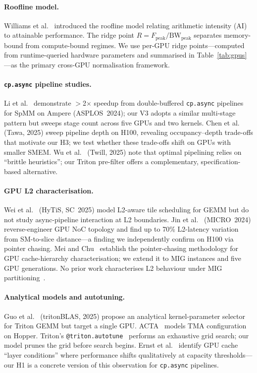 \documentclass[10pt,twocolumn]{article}
\newcommand{\cpasync}{\texttt{cp.async}}
\begin{document}
\paragraph{Roofline model.}
Williams et al.~\cite{roofline} introduced the roofline model
relating arithmetic intensity (AI) to attainable performance.  The
ridge point $R = F_{\text{peak}} / \text{BW}_{\text{peak}}$
separates memory-bound from compute-bound regimes.  We use per-GPU
ridge points---computed from runtime-queried hardware parameters
and summarised in Table~\ref{tab:gpus}---as the primary cross-GPU
normalisation framework.

\paragraph{\cpasync{} pipeline studies.}
Li et al.~\cite{dtcspmm} demonstrate $>$2$\times$ speedup from
double-buffered \cpasync{} pipelines for SpMM on Ampere
(ASPLOS~2024); our V3 adopts a similar multi-stage pattern but
sweeps stage count across five GPUs and two kernels.  Chen et
al.~\cite{tawa} (Tawa, 2025) sweep pipeline depth on H100,
revealing occupancy--depth trade-offs that motivate our H3; we test
whether these trade-offs shift on GPUs with smaller SMEM.  Wu et
al.~\cite{twill} (Twill, 2025) note that optimal pipelining relies
on ``brittle heuristics''; our Triton pre-filter offers a
complementary, specification-based alternative.

\paragraph{GPU L2 characterisation.}
Wei et al.~\cite{hytis} (HyTiS, SC~2025) model L2-aware tile
scheduling for GEMM but do not study async-pipeline interaction at
L2 boundaries.  Jin et al.~\cite{gpu_noc} (MICRO~2024)
reverse-engineer GPU NoC topology and find up to 70\% L2-latency
variation from SM-to-slice distance---a finding we independently
confirm on H100 via pointer chasing.  Mei and
Chu~\cite{mei_dissecting} establish the pointer-chasing methodology
for GPU cache-hierarchy characterisation; we extend it to MIG
instances and five GPU generations.  No prior work characterises
L2 behaviour under MIG partitioning~\cite{mig_guide}.

\paragraph{Analytical models and autotuning.}
Guo et al.~\cite{tritonblas} (tritonBLAS, 2025) propose an
analytical kernel-parameter selector for Triton GEMM but target a
single GPU.  ACTA~\cite{acta} models TMA configuration on Hopper.
Triton's \texttt{@triton.autotune}~\cite{triton} performs an
exhaustive grid search; our model prunes the grid before search
begins.  Ernst et al.~\cite{layer_conditions} identify GPU cache
``layer conditions'' where performance shifts qualitatively at
capacity thresholds---our H1 is a concrete version of this
observation for \cpasync{} pipelines.
\end{document}
